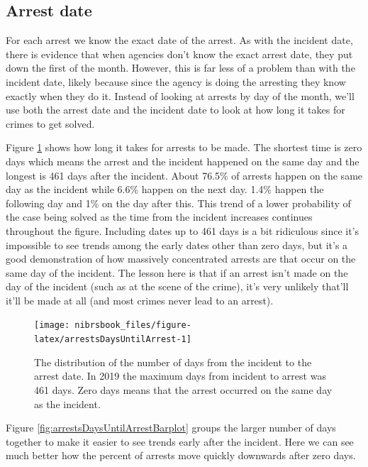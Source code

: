 \documentclass[
  12pt,
  openany]{book}
\begin{document}
\hypertarget{arrest-date}{%
\subsection{Arrest date}\label{arrest-date}}

For each arrest we know the exact date of the arrest. As with the incident date, there is evidence that when agencies don't know the exact arrest date, they put down the first of the month. However, this is far less of a problem than with the incident date, likely because since the agency is doing the arresting they know exactly when they do it. Instead of looking at arrests by day of the month, we'll use both the arrest date and the incident date to look at how long it takes for crimes to get solved.

Figure \ref{fig:arrestsDaysUntilArrest} shows how long it takes for arrests to be made. The shortest time is zero days which means the arrest and the incident happened on the same day and the longest is 461 days after the incident. About 76.5\% of arrests happen on the same day as the incident while 6.6\% happen on the next day. 1.4\% happen the following day and 1\% on the day after this. This trend of a lower probability of the case being solved as the time from the incident increases continues throughout the figure. Including dates up to 461 days is a bit ridiculous since it's impossible to see trends among the early dates other than zero days, but it's a good demonstration of how massively concentrated arrests are that occur on the same day of the incident. The lesson here is that if an arrest isn't made on the day of the incident (such as at the scene of the crime), it's very unlikely that'll it'll be made at all (and most crimes never lead to an arrest).

\begin{figure}

{\centering \texttt{[image: nibrsbook\_files/figure-latex/arrestsDaysUntilArrest-1]} 

}

\caption{The distribution of the number of days from the incident to the arrest date. In 2019 the maximum days from incident to arrest was 461 days. Zero days means that the arrest occurred on the same day as the incident.}\label{fig:arrestsDaysUntilArrest}
\end{figure}

Figure \ref{fig:arrestsDaysUntilArrestBarplot} groups the larger number of days together to make it easier to see trends early after the incident. Here we can see much better how the percent of arrests move quickly downwards after zero days.
\end{document}
